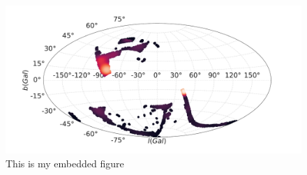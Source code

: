\documentclass[fleqn,usenatbib]{mnras}
\begin{document}
\begin{figure}
\includegraphics[width=0.9\linewidth]{Figs/halpha-emitters-galactic-aitoff.pdf}
\centering
{}
\caption{This is my embedded figure}
\end{figure}
\end{document}
